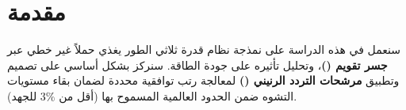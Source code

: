 
\section{مقدمة} \label{sec:sec1}
    \thispagestyle{empty} %
    {\fontsize{16}{28}\selectfont
    سنعمل في هذه الدراسة على نمذجة نظام قدرة ثلاثي الطور يغذي حملاً غير خطي عبر \textbf{جسر تقويم ()}، وتحليل تأثيره على جودة الطاقة. سنركز بشكل أساسي على تصميم وتطبيق \textbf{مرشحات التردد الرنيني ()} لمعالجة رتب توافقية محددة لضمان بقاء مستويات التشوه ضمن الحدود العالمية المسموح بها (أقل من $3\%$ للجهد).
    \par}
    